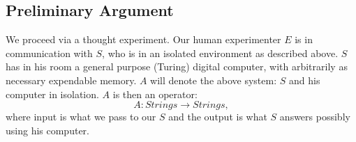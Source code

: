 \documentclass[9pt,twocolumn,twoside,lineno]{pnas-new}
\numberwithin{equation}{section}
\theoremstyle{definition}
\theoremstyle{remark}
\begin{document}
\subsection {Preliminary Argument}
We proceed via a thought experiment. Our human experimenter $E$ is in communication with $S$, who is in an isolated environment as described above.
$S$ has in his room a general purpose (Turing) digital computer, with arbitrarily as necessary expendable memory.   $A$ will denote  the above system: $S$ and his computer in isolation.  $A$ is then an operator: $$A: Strings \to Strings,$$ where input is what we pass to our $S$ and the output is what $S$ answers possibly using his computer. 
\end{document}

